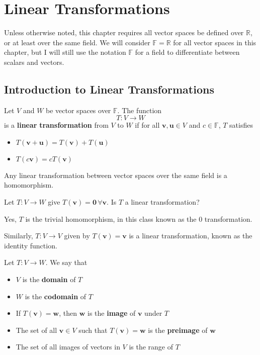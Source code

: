 \chapter{Linear Transformations}
Unless otherwise noted, this chapter requires all vector spaces be defined over \(\mathbb{R} \), or at least over the same field. We will consider \(\mathbb{F} =\mathbb{R} \) for all vector spaces in this chapter, but I will still use the notation \(\mathbb{F} \) for a field to differentiate between scalars and vectors.
\section{Introduction to Linear Transformations}
\begin{definition}
    Let \(V\) and \(W\) be vector spaces over \(\mathbb{F} \). The function 
    \[
        T: V\to W
    \]
    is a \textbf{linear} \textbf{transformation} from \(V\) to \(W\) if for all \(\mathbf{v} ,\mathbf{u} \in V\) and \(c\in\mathbb{F} \), \(T\) satisfies
    \begin{itemize}
        \item \(T(\mathbf{v} +\mathbf{u} )=T(\mathbf{v} )+T(\mathbf{u} )\) 
        \item \(T(c \mathbf{v} )=cT(\mathbf{v} )\) 
    \end{itemize}
\end{definition}
\begin{remark}
    Any linear transformation between vector spaces over the same field is a homomorphism.
\end{remark}
\begin{exercise}
    Let \(T:V\to W\) give \(T(\mathbf{v} )=\mathbf{0}\,\forall \mathbf{v}  \). Is \(T\) a linear transformation?
\end{exercise}
\begin{solution}
    Yes, \(T\) is the trivial homomorphism, in this class known as the \(0\) transformation.
\end{solution}
Similarly, \(T:V\to V\) given by \(T(\mathbf{v} )=\mathbf{v} \) is a linear transformation, known as the identity function.
\begin{definition}
    Let \(T:V\to W\). We say that
    \begin{itemize}
        \item \(V\) is the \textbf{domain} of \(T\)
        \item \(W\) is the \textbf{codomain} of \(T\) 
        \item If \(T(\mathbf{v} )=\mathbf{w} \), then \(\mathbf{w} \) is the \textbf{image} of \(\mathbf{v} \) under \(T\)
        \item The set of all \(\mathbf{v} \in V\) such that \(T(\mathbf{v} )=\mathbf{w} \) is the \textbf{preimage} of \(\mathbf{w} \)
        \item The set of all images of vectors in \(V\) is the range of \(T\)
    \end{itemize}
\end{definition}
